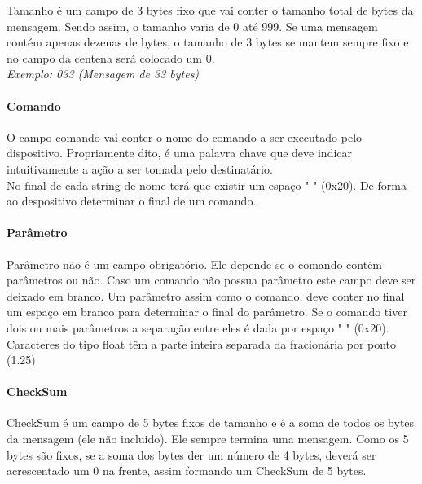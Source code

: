 \documentclass[11pt,a4paper]{article}
\begin{document}
Tamanho é um campo de 3 bytes fixo que vai conter o tamanho total de bytes da mensagem. Sendo assim, o tamanho varia de 0 até 999.
Se uma mensagem contém apenas dezenas de bytes, o tamanho de 3 bytes se mantem sempre fixo e no campo da centena será colocado um 0.\\

\textsl{Exemplo: 033 (Mensagem de 33 bytes)} \\



\paragraph{\textbf{Comando} \newline \newline} 
O campo comando vai conter o nome do comando a ser executado pelo dispositivo. Propriamente dito, é uma palavra chave que deve indicar intuitivamente a ação a ser tomada pelo destinatário. \\
No final de cada string de nome terá que existir um espaço " " (0x20). De forma ao despositivo determinar o final de um comando. \\



\paragraph{\textbf{Parâmetro} \newline \newline } 
Parâmetro não é um campo obrigatório. Ele depende se o comando contém parâmetros ou não.
Caso um comando não possua parâmetro este campo deve ser deixado em branco.
Um parâmetro assim como o comando, deve conter no final um espaço em branco para determinar o final do parâmetro. 
Se o comando tiver dois ou mais parâmetros a separação entre eles é dada por espaço " " (0x20). Caracteres do tipo float têm a parte inteira separada da fracionária por ponto (1.25) 

\paragraph{\textbf{CheckSum} \newline \newline } 
CheckSum é um campo de 5 bytes fixos de tamanho e é a soma de todos os bytes da mensagem (ele não incluido). Ele sempre termina uma mensagem. Como os 5 bytes são fixos, se a soma dos bytes der um número de 4 bytes, deverá ser acrescentado um 0 na frente, assim formando um CheckSum de 5 bytes.\\
\end{document}
